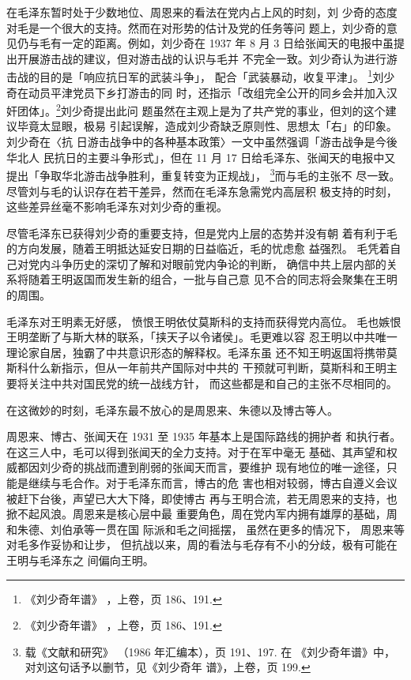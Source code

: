 在毛泽东暂时处于少数地位、周恩来的看法在党内占上风的时刻，刘
少奇的态度对毛是一个很大的支持。然而在对形势的估计及党的任务等问
题上，刘少奇的意见仍与毛有一定的距离。例如，刘少奇在 1937 年 8 月 3
日给张闻天的电报中虽提出开展游击战的建议，但对游击战的认识与毛并
不完全一致。刘少奇认为进行游击战的目的是「响应抗日军的武装斗争」，
配合「武装暴动，收复平津」。 \footnote{《刘少奇年谱》
，上卷，页 186、191.}刘少奇在动员平津党员下乡打游击的同
时，还指示「改组完全公开的同乡会并加入汉奸团体」。\footnote{《刘少奇年谱》
，上卷，页 186、191.}刘少奇提出此问
题虽然在主观上是为了共产党的事业，但刘的这个建议毕竟太显眼，极易
引起误解，造成刘少奇缺乏原则性、思想太「右」的印象。刘少奇在〈抗
日游击战争中的各种基本政策〉一文中虽然强调「游击战争是今後华北人
民抗日的主要斗争形式」，但在 11 月 17 日给毛泽东、张闻天的电报中又
提出「争取华北游击战争胜利，重复转变为正规战」， \footnote{载《文献和研究》
（1986 年汇编本），页 191、197. 在
《刘少奇年谱》中，对刘这句话予以删节，见《刘少奇年 谱》，上卷，页 199.}而与毛的主张不
尽一致。尽管刘与毛的认识存在若干差异，然而在毛泽东急需党内高层积
极支持的时刻，这些差异丝毫不影响毛泽东对刘少奇的重视。

尽管毛泽东已获得刘少奇的重要支持，但是党内上层的态势并没有朝
着有利于毛的方向发展，随着王明抵达延安日期的日益临近，毛的忧虑愈
益强烈。
毛凭着自己对党内斗争历史的深切了解和对眼前党内争论的判断，
确信中共上层内部的关系将随着王明返国而发生新的组合，一批与自己意
见不合的同志将会聚集在王明的周围。

毛泽东对王明素无好感，
愤恨王明依仗莫斯科的支持而获得党内高位。
毛也嫉恨王明垄断了与斯大林的联系，「挟天子以令诸侯」。毛更难以容
忍王明以中共唯一理论家自居，独霸了中共意识形态的解释权。毛泽东虽
还不知王明返国将携带莫斯科什么新指示，但从一年前共产国际对中共的
干预就可判断，莫斯科和王明主要将关注中共对国民党的统一战线方针，
而这些都是和自己的主张不尽相同的。
 
在这微妙的时刻，毛泽东最不放心的是周恩来、朱德以及博古等人。
 
周恩来、博古、张闻天在 1931 至 1935 年基本上是国际路线的拥护者
和执行者。在这三人中，毛可以得到张闻天的全力支持。对于在军中毫无
基础、其声望和权威都因刘少奇的挑战而遭到削弱的张闻天而言，要维护
现有地位的唯一途径，只能是继续与毛合作。对于毛泽东而言，博古的危
害也相对较弱，博古自遵义会议被赶下台後，声望已大大下降，即使博古
再与王明合流，若无周恩来的支持，也掀不起风浪。周恩来是核心层中最
重要角色，周在党内军内拥有雄厚的基础，周和朱德、刘伯承等一贯在国
际派和毛之间摇摆，
虽然在更多的情况下，
周恩来等对毛多作妥协和让步，
但抗战以来，周的看法与毛存有不小的分歧，极有可能在王明与毛泽东之
间偏向王明。
 
